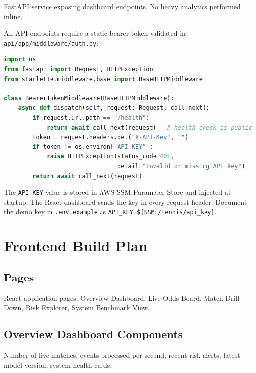 \documentclass[11pt,a4paper]{article}
\begin{document}
FastAPI service exposing dashboard endpoints. No heavy analytics performed inline.

\begin{importantbox}
All API endpoints require a static bearer token validated in
\texttt{api/app/middleware/auth.py}:

\begin{lstlisting}[language=python, caption={auth.py}]
import os
from fastapi import Request, HTTPException
from starlette.middleware.base import BaseHTTPMiddleware

class BearerTokenMiddleware(BaseHTTPMiddleware):
    async def dispatch(self, request: Request, call_next):
        if request.url.path == "/health":
            return await call_next(request)   # health check is public
        token = request.headers.get("X-API-Key", "")
        if token != os.environ["API_KEY"]:
            raise HTTPException(status_code=401,
                                detail="Invalid or missing API key")
        return await call_next(request)
\end{lstlisting}

The \texttt{API\_KEY} value is stored in AWS SSM Parameter Store and injected at startup. The
React dashboard sends the key in every request header. Document the demo key in
\texttt{.env.example} as \texttt{API\_KEY=\$\{SSM:/tennis/api\_key\}}.
\end{importantbox}

\section{Frontend Build Plan}

\subsection{Pages}

React application pages: Overview Dashboard, Live Odds Board, Match Drill-Down, Risk Explorer,
System Benchmark View.

\subsection{Overview Dashboard Components}

Number of live matches, events processed per second, recent risk alerts, latest model version,
system health cards.
\end{document}
